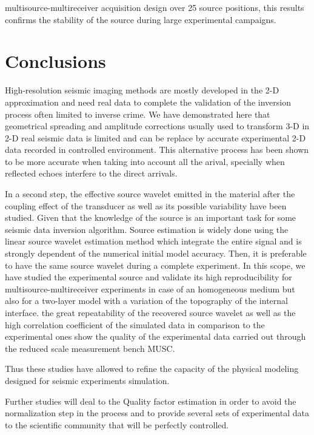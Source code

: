 \documentclass[manuscript,revised]{geophysics}
\newcommand{\twod}{2-D }
\newcommand{\thrd}{3-D }
\begin{document}
multisource-multireceiver acquisition design over 25 source positions, this results confirms the stability of the source during large experimental campaigns.     


\section{Conclusions}

\noindent High-resolution seismic imaging methods are mostly developed in the \twod approximation and need real data to complete the validation of the inversion process often limited to inverse crime. We have demonstrated here that geometrical spreading and amplitude corrections usually used to transform \thrd in \twod real seismic data is limited and can be replace by accurate experimental \twod data recorded in controlled environment. This alternative process has been shown to be more accurate when taking into account all the arival, specially when reflected echoes interfere to the direct arrivals.

\noindent In a second step, the effective source wavelet emitted in the material after the coupling effect of the transducer as well as its possible variability have been studied. Given that the knowledge of the source is an important task for some seismic data inversion algorithm. Source estimation is widely done using the linear source wavelet estimation method which integrate the entire signal and is strongly dependent of the numerical initial model accuracy. Then, it is preferable to have the same source wavelet during a complete experiment. In this scope, we have studied the experimental source and validate its high reproducibility for multisource-multireceiver experiments in case of an homogeneous medium but also for a two-layer model with a variation of the topography of the internal interface. the great repeatability of the recovered source wavelet as well as the high correlation coefficient of the simulated data in comparison to the experimental ones show the quality of the experimental data carried out through the reduced scale measurement bench MUSC. 
 
\noindent  Thus these studies have allowed to refine the capacity of the physical modeling designed for seismic experiments simulation. 

\noindent Further studies will deal to the Quality factor estimation in order to avoid the normalization step in the process and to provide several sets of experimental data to the scientific community that will be perfectly controlled. 
\end{document}
